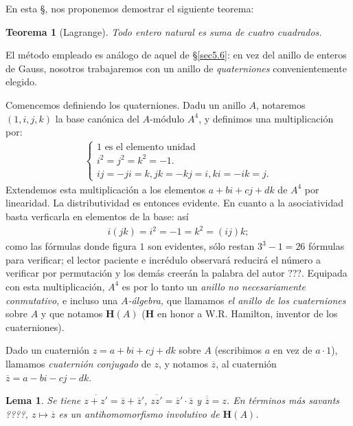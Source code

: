 \documentclass[bibtotoc,leqno,spanish]{amsbook}
\newcommand{\HH}{\mathbf{H}}
\newcommand{\oline}[1]{\overline{#1}}
\numberwithin{equation}{section}
\theoremstyle{note}
\theoremstyle{note}
\newtheorem{theorem}{Teorema}
\newtheorem{lemma}{Lema}
\theoremstyle{rem}
\numberwithin{theorem}{section}
\numberwithin{proposition}{section}
\numberwithin{definition}{section}
\numberwithin{lemma}{section}
\numberwithin{corollary}{section}
\numberwithin{example}{section}
\numberwithin{footnote}{section}%
\begin{document}
En esta \S, nos proponemos demostrar el siguiente teorema:

\begin{theorem}[Lagrange]\label{teo5.7.1}
Todo entero natural es suma de cuatro cuadrados.
\end{theorem}

El m\'etodo empleado es an\'alogo de aquel de \S\ref{sec5.6}: en vez del anillo de enteros de Gauss, nosotros
trabajaremos con un anillo de {\em quaterniones} convenientemente elegido.

Comencemos definiendo los quaterniones. Dadu un anillo $A$, notaremos $(1,i,j,k)$ la base can\'onica del
$A$-m\'odulo $A^{4}$, y definimos una multiplicaci\'on por:
\begin{gather}\label{eq-5.7-1}
\begin{cases}
\text{$1$ es el elemento unidad}\\
\text{$i^{2}=j^{2}=k^{2}=-1$.}\\
\text{$ij=-ji=k, jk=-kj=i, ki=-ik=j$.}
\end{cases}
\end{gather}
Extendemos esta multiplicaci\'on a los elementos $a+bi+cj+dk$ de $A^{4}$ por linearidad. La distributividad
es entonces evidente. En cuanto a la asociatividad basta verficarla en elementos de la base: as\'i
\begin{gather*}
i(jk) = i^{2} = -1 = k^{2} = (ij)k;
\end{gather*}
como las f\'ormulas donde figura $1$ son evidentes, s\'olo restan $3^{3}-1=26$ f\'ormulas para verificar;
el lector paciente e incr\'edulo observar\'a reducir\'a el n\'umero a verificar por permutaci\'on y los
dem\'as creer\'an la palabra del autor ???. Equipada con esta multiplicaci\'on, $A^{4}$ es por lo tanto
un {\em anillo no necesariamente conmutativo,} e incluso una {\em $A$-\'algebra,} que llamamos
{\em el anillo de los cuaterniones} sobre $A$ y que notamos $\HH(A)$ ($\HH$ en honor a W.R. Hamilton, inventor
de los cuaterniones).

Dado un cuaterni\'on $z = a+bi+cj+dk$ sobre $A$ (escribimos $a$ en vez de $a\cdot 1$), llamamos
{\em cuaterni\'on conjugado} de $z$, y notamos $\oline z$, al cuaterni\'on $\oline z = a-bi-cj-dk$.

\begin{lemma}
Se tiene $\oline{z+z'} = \oline z+\oline z'$, $\oline{zz'} = \oline z'\cdot\oline z$ y
$\oline{\oline z}=z$. En t\'erminos m\'as savants ????, $z\mapsto\oline z$ es un antihomomorfismo involutivo
de $\HH(A)$.
\end{lemma}
\end{document}
